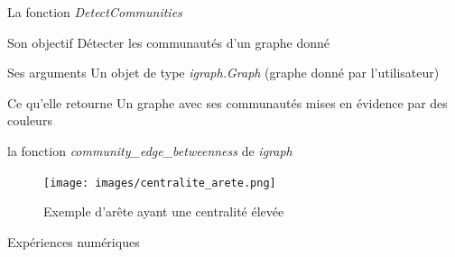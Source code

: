 \documentclass[11pt]{beamer}
\begin{document}
	\begin{frame}{La fonction \textit{DetectCommunities}}
		\begin{block}{Son objectif}
			Détecter les communautés d'un graphe donné
		\end{block}	
		\begin{block}{Ses arguments}
			Un objet de type \textit{igraph.Graph} (graphe donné par l'utilisateur)
		\end{block}
		\begin{block}{Ce qu'elle retourne}
			Un graphe avec ses communautés mises en évidence par des couleurs
		\end{block}                            
	\end{frame}
	
	\begin{frame}{la fonction \textit{community\_edge\_betweenness} de \textit{igraph}}
		\begin{figure}[H]
			\centering
			\texttt{[image: images/centralite\_arete.png]}
			\caption{Exemple d'arête ayant une centralité élevée}
		\end{figure}
	\end{frame}
	
	\begin{frame}{Expériences numériques}
		\begin{figure}[htp] 
			\centering
			\hfill%
		\end{figure}
	\end{frame}
	
\end{document}
